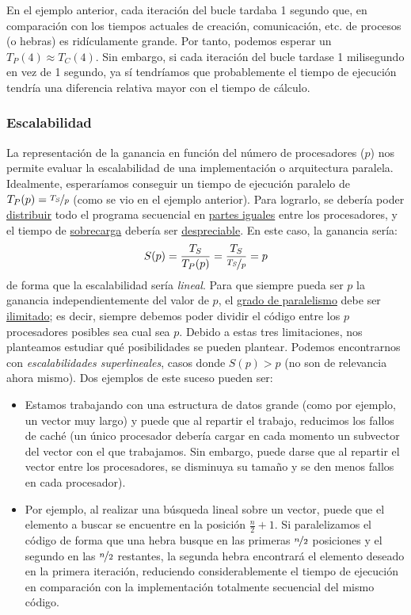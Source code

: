 En el ejemplo anterior, cada iteración del bucle tardaba 1 segundo que, en comparación con los tiempos actuales de creación, comunicación, etc. de procesos (o hebras) es ridículamente grande. Por tanto, podemos esperar un $T_P(4) \approx T_C(4)$. Sin embargo, si cada iteración del bucle tardase 1 milisegundo en vez de 1 segundo, ya sí tendríamos que probablemente el tiempo de ejecución tendría una diferencia relativa mayor con el tiempo de cálculo.

\subsubsection{Escalabilidad}
La representación de la ganancia en función del número de procesadores ($p$) nos permite evaluar la escalabilidad de una implementación o arquitectura paralela. Idealmente, esperaríamos conseguir un tiempo de ejecución paralelo de ${T_P(p) = \nicefrac{T_S}{p}}$ (como se vio en el ejemplo anterior). Para lograrlo, se debería poder \underline{distribuir} todo el programa secuencial en \underline{partes iguales} entre los procesadores, y el tiempo de \underline{sobrecarga} debería ser \underline{despreciable}. En este caso, la ganancia sería:
\begin{equation*}
    S(p) = \dfrac{T_S}{T_P(p)} = \dfrac{T_S}{\nicefrac{T_S}{p}} = p
\end{equation*}
de forma que la escalabilidad sería \emph{lineal}. Para que siempre pueda ser $p$ la ganancia independientemente del valor de $p$, el \underline{grado de paralelismo} debe ser \underline{ilimitado}; es decir, siempre debemos poder dividir el código entre los $p$ procesadores posibles sea cual sea $p$. Debido a estas tres limitaciones, nos planteamos estudiar qué posibilidades se pueden plantear.
Podemos encontrarnos con \emph{escalabilidades superlineales}, casos donde $S(p)>p$ (no son de relevancia ahora mismo). Dos ejemplos de este suceso pueden ser:\label{ej:superlineal}
\begin{itemize}
    \item Estamos trabajando con una estructura de datos grande (como por ejemplo, un vector muy largo) y puede que al repartir el trabajo, reducimos los fallos de caché (un único procesador debería cargar en cada momento un subvector del vector con el que trabajamos. Sin embargo, puede darse que al repartir el vector entre los procesadores, se disminuya su tamaño y se den menos fallos en cada procesador).
    \item Por ejemplo, al realizar una búsqueda lineal sobre un vector, puede que el elemento a buscar se encuentre en la posición $\frac{n}{2}+1$. Si paralelizamos el código de forma que una hebra busque en las primeras $\nicefrac{n}{2}$ posiciones y el segundo en las $\nicefrac{n}{2}$ restantes, la segunda hebra encontrará el elemento deseado en la primera iteración, reduciendo considerablemente el tiempo de ejecución en comparación con la implementación totalmente secuencial del mismo código.
\end{itemize}
